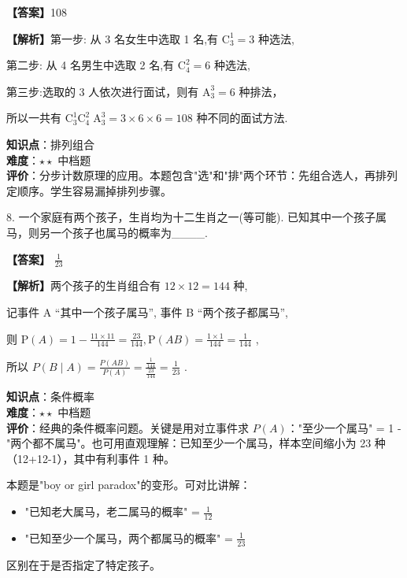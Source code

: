\documentclass[10pt]{article}
\begin{document}
\textbf{【答案】}108

\textbf{【解析】}第一步: 从 3 名女生中选取 1 名,有 \({\mathrm{C}}_{3}^{1} = 3\) 种选法,

第二步: 从 4 名男生中选取 2 名,有 \({\mathrm{C}}_{4}^{2} = 6\) 种选法,

第三步:选取的 3 人依次进行面试，则有 \({\mathrm{A}}_{3}^{3} = 6\) 种排法，

所以一共有 \({\mathrm{C}}_{3}^{1}{\mathrm{C}}_{4}^{2}{\mathrm{\;A}}_{3}^{3} = 3 \times  6 \times  6 = {108}\) 种不同的面试方法.

\begin{analysisbox}[考点分析]
\textbf{知识点}：排列组合\\
\textbf{难度}：\(\star\star\) 中档题\\
\textbf{评价}：分步计数原理的应用。本题包含"选"和"排"两个环节：先组合选人，再排列定顺序。学生容易漏掉排列步骤。
\end{analysisbox}

8. 一个家庭有两个孩子，生肖均为十二生肖之一(等可能). 已知其中一个孩子属马，则另一个孩子也属马的概率为\_\_\_\_.

\textbf{【答案】} \(\frac{1}{23}\)

\textbf{【解析】}两个孩子的生肖组合有 \({12} \times  {12} = {144}\) 种,

记事件 A ``其中一个孩子属马'', 事件 B ``两个孩子都属马'',

则 \(\mathrm{P}\left( A\right)  = 1 - \frac{{11} \times  {11}}{144} = \frac{23}{144},\mathrm{P}\left( {AB}\right)  = \frac{1 \times  1}{144} = \frac{1}{144}\) ,

所以 \(P\left( {B \mid  A}\right)  = \frac{P\left( {AB}\right) }{P\left( A\right) } = \frac{\frac{1}{144}}{\frac{23}{144}} = \frac{1}{23}\) .

\begin{analysisbox}[考点分析]
\textbf{知识点}：条件概率\\
\textbf{难度}：\(\star\star\) 中档题\\
\textbf{评价}：经典的条件概率问题。关键是用对立事件求 \(P(A)\)："至少一个属马" = 1 - "两个都不属马"。也可用直观理解：已知至少一个属马，样本空间缩小为 23 种（12+12-1），其中有利事件 1 种。
\end{analysisbox}

\begin{tipbox}[教学提示]
本题是"boy or girl paradox"的变形。可对比讲解：
\begin{itemize}
\item "已知老大属马，老二属马的概率" = \(\frac{1}{12}\)
\item "已知至少一个属马，两个都属马的概率" = \(\frac{1}{23}\)
\end{itemize}
区别在于是否指定了特定孩子。
\end{tipbox}
\end{document}
